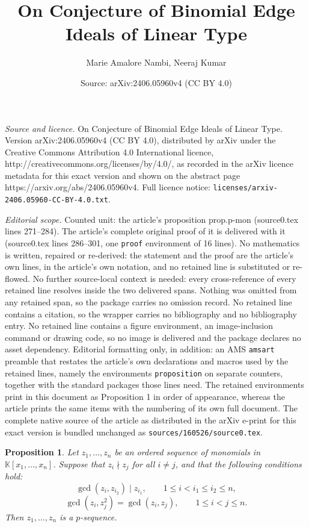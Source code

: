 \documentclass[10pt,a4paper]{amsart}
\title{On Conjecture of Binomial Edge Ideals of Linear Type}
\author{Marie Amalore Nambi, Neeraj Kumar}
\date{Source: arXiv:2406.05960v4 (CC BY 4.0)}
\newtheorem{proposition}{Proposition}
\begin{document}
\maketitle

\noindent\emph{Source and licence.} On Conjecture of Binomial Edge Ideals of Linear Type. Version arXiv:2406.05960v4 (CC BY 4.0), distributed by arXiv under the Creative Commons Attribution 4.0 International licence, http://creativecommons.org/licenses/by/4.0/, as recorded in the arXiv licence metadata for this exact version and shown on the abstract page https://arxiv.org/abs/2406.05960v4. Full licence notice: \texttt{licenses/arxiv-2406.05960-CC-BY-4.0.txt}.\par\smallskip

\noindent\textit{Editorial scope.} Counted unit: the article's proposition prop.p-mon (source0.tex lines 271--284). The article's complete original proof of it is delivered with it (source0.tex lines 286--301, one \texttt{proof} environment of 16 lines). No mathematics is written, repaired or re-derived: the statement and the proof are the article's own lines, in the article's own notation, and no retained line is substituted or re-flowed.  No further source-local context is needed: every cross-reference of every retained line resolves inside the two delivered spans.  Nothing was omitted from any retained span, so the package carries no omission record.  No retained line contains a citation, so the wrapper carries no bibliography and no bibliography entry.  No retained line contains a figure environment, an image-inclusion command or drawing code, so no image is delivered and the package declares no asset dependency.  Editorial formatting only, in addition: an AMS \texttt{amsart} preamble that restates the article's own declarations and macros used by the retained lines, namely the environments \texttt{proposition} on separate counters, together with the standard packages those lines need.  The retained environments print in this document as Proposition 1 in order of appearance, whereas the article prints the same items with the numbering of its own full document.  The complete native source of the article as distributed in the arXiv e-print for this exact version is bundled unchanged as \texttt{sources/160526/source0.tex}.
\begin{proposition}\label{prop.p-mon}
Let \(z_1,\ldots,z_n\) be an ordered sequence of monomials in \(\mathbb{K}[x_1,\ldots,x_n]\). Suppose that \(z_i \nmid z_j\) for all \(i \neq j\), and that the following conditions hold:
\begin{equation}\label{cond1}
\gcd(z_i,z_{i_2}) \mid z_{i_1},
\qquad
1 \leq i < i_1 \leq i_2 \leq n,
\end{equation}
\begin{equation}\label{cond2}
\gcd(z_i,z_j^2) = \gcd(z_i,z_j),
\qquad
1 \leq i < j \leq n.
\end{equation}
Then \(z_1,\ldots,z_n\) is a \(p\)-sequence.
\end{proposition}
\end{document}
